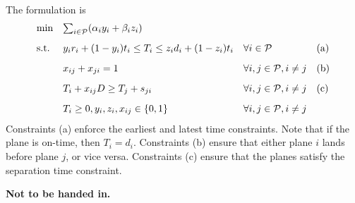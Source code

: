 \documentclass[10pt]{article}
\begin{document}
\begin{enumerate}
  The formulation is
  \[
  \begin{array}{llll}
    \min & \sum_{i \in {\cal P}} (\alpha_i y_i + \beta_i z_i) & & \\[3mm]
    \mbox{s.t.} & y_i r_i + (1-y_i) t_i \leq T_i \leq z_i d_i + (1-z_i)
    t_i & \forall i \in {\cal P} & \mbox{(a)} \\[3mm]
    & x_{ij} + x_{ji} = 1 & \forall i,j \in {\cal P}, i \ne j & \mbox{(b)} \\[3mm]
    & T_i + x_{ij} D \geq T_j + s_{ji} & \forall i,j \in {\cal P}, i \ne j & \mbox{(c)} \\[3mm]
    & T_i \geq 0, y_i, z_i, x_{ij} \in \{0,1\} & \forall i,j \in {\cal P}, i \ne j & 
  \end{array}
  \]
  Constraints (a) enforce the earliest and latest time
  constraints. Note that if the plane is on-time, then $T_i =
  d_i$. Constraints (b) ensure that either plane $i$ lands before plane $j$,
  or vice versa. Constraints (c) ensure that the planes satisfy the
  separation time constraint.

\end{enumerate}

\newpage

{\bf Not to be handed in.}
\end{document}
